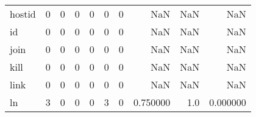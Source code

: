 \begin{tabular}{lrrrrrrrrr}
hostid    &                                       0 &                                                  0 &                                                  0 &                                                  0 &                                                  0 &                                                  0 &                                                NaN &                                    NaN &                                  NaN \\
id        &                                       0 &                                                  0 &                                                  0 &                                                  0 &                                                  0 &                                                  0 &                                                NaN &                                    NaN &                                  NaN \\
join      &                                       0 &                                                  0 &                                                  0 &                                                  0 &                                                  0 &                                                  0 &                                                NaN &                                    NaN &                                  NaN \\
kill      &                                       0 &                                                  0 &                                                  0 &                                                  0 &                                                  0 &                                                  0 &                                                NaN &                                    NaN &                                  NaN \\
link      &                                       0 &                                                  0 &                                                  0 &                                                  0 &                                                  0 &                                                  0 &                                                NaN &                                    NaN &                                  NaN \\
ln        &                                       3 &                                                  0 &                                                  0 &                                                  0 &                                                  3 &                                                  0 &                                           0.750000 &                                    1.0 &                             0.000000 \\

\end{tabular}
